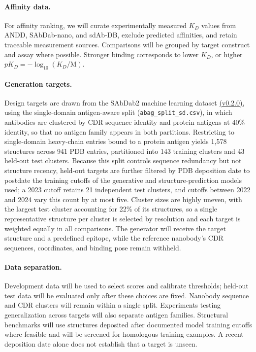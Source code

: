 \paragraph{Affinity data.}
For affinity ranking, we will curate experimentally measured $K_D$ values from ANDD, SAbDab-nano, and sdAb-DB, exclude predicted affinities, and retain traceable measurement sources. Comparisons will be grouped by target construct and assay where possible. Stronger binding corresponds to lower $K_D$, or higher $pK_D = -\log_{10}(K_D/\mathrm{M})$.

\paragraph{Generation targets.}
Design targets are drawn from the SAbDab2 machine learning dataset \href{https://zenodo.org/records/22019991}{(v0.2.0)}, using the single-domain antigen-aware split (\texttt{abag\_split\_sd.csv}), in which antibodies are clustered by CDR sequence identity and protein antigens at 40\% identity, so that no antigen family appears in both partitions. Restricting to single-domain heavy-chain entries bound to a protein antigen yields 1{,}578 structures across 941 PDB entries, partitioned into 143 training clusters and 43 held-out test clusters. Because this split controls sequence redundancy but not structure recency, held-out targets are further filtered by PDB deposition date to postdate the training cutoffs of the generative and structure-prediction models used; a 2023 cutoff retains 21 independent test clusters, and cutoffs between 2022 and 2024 vary this count by at most five. Cluster sizes are highly uneven, with the largest test cluster accounting for 22\% of its structures, so a single representative structure per cluster is selected by resolution and each target is weighted equally in all comparisons. The generator will receive the target structure and a predefined epitope, while the reference nanobody's CDR sequences, coordinates, and binding pose remain withheld.

\paragraph{Data separation.}
Development data will be used to select scores and calibrate thresholds; held-out test data will be evaluated only after these choices are fixed. Nanobody sequence and CDR clusters will remain within a single split. Experiments testing generalization across targets will also separate antigen families. Structural benchmarks will use structures deposited after documented model training cutoffs where feasible and will be screened for homologous training examples. A recent deposition date alone does not establish that a target is unseen.

